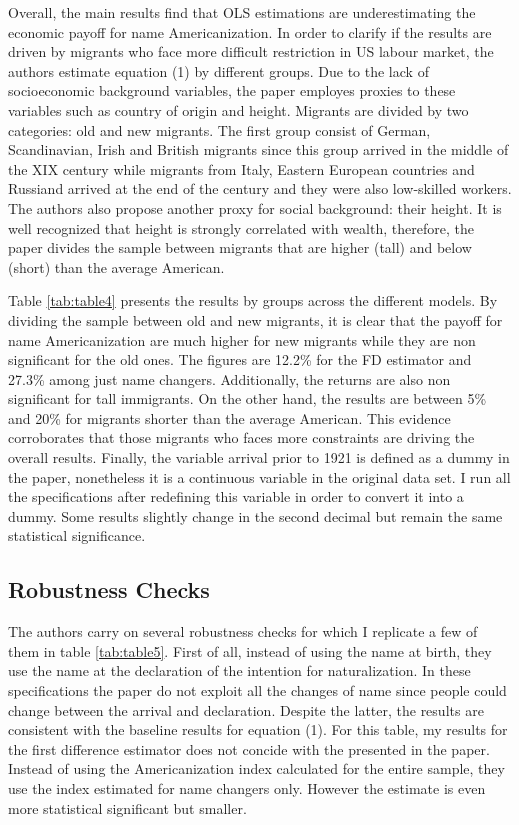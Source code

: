 \documentclass[12pt]{article}
\begin{document}
Overall, the main results find that OLS estimations are underestimating the economic payoff for name Americanization. In order to clarify if the results are driven by migrants who face more difficult restriction in US labour market, the authors estimate equation (1) by different groups. Due to the lack of socioeconomic background variables, the paper employes proxies to these variables such as country of origin and height. Migrants are divided by two categories: old and new migrants. The first group consist of German, Scandinavian, Irish and British migrants since this group arrived in the middle of the XIX century while migrants from Italy, Eastern European countries and Russiand arrived at the end of the century and they were also low-skilled workers. The authors also propose another proxy for social background: their height. It is well recognized that height is strongly correlated with wealth, therefore, the paper divides the sample between migrants that are higher (tall) and below (short) than the average American.







Table \ref{tab:table4} presents the results by groups across the different models. By dividing the sample between old and new migrants, it is clear that the payoff for name Americanization are much higher for new migrants while they are non significant for the old ones. The figures are 12.2\% for the FD estimator and 27.3\% among just name changers. Additionally, the returns are also non significant for tall immigrants. On the other hand, the results are between 5\% and 20\% for migrants shorter than the average American. This evidence corroborates that those migrants who faces more constraints are driving the overall results. Finally, the variable arrival prior to 1921 is defined as a dummy in the paper, nonetheless it is a continuous variable in the original data set. I run all the specifications after redefining this variable in order to convert it into a dummy. Some results slightly change in the second decimal but remain the same statistical significance. 




\subsection{Robustness Checks}

The authors carry on several robustness checks for which I replicate a few of them in table  \ref{tab:table5}. First of all, instead of using the name at birth, they use the name at the declaration of the intention for naturalization. In these specifications the paper do not exploit all the changes of name since people could change between the arrival and declaration. Despite the latter, the results are consistent with the baseline results for equation (1). For this table, my results for the first difference estimator does not concide with the presented in the paper. Instead of using the Americanization index calculated for the entire sample, they use the index estimated for name changers only. However the estimate is even more statistical significant but smaller.
\end{document}
